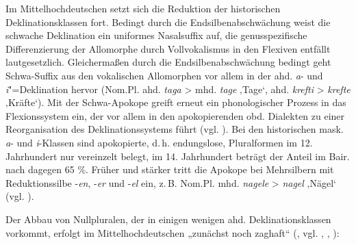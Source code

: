 Im Mittelhochdeutschen setzt sich die Reduktion der historischen Deklinationsklassen fort. Bedingt durch die Endsilbenabschwächung weist die schwache Deklination ein uniformes Nasalsuffix auf, die genusspezifische Differenzierung der Allomorphe durch Vollvokalismus in den Flexiven entfällt lautgesetzlich. Gleichermaßen durch die Endsilbenabschwächung bedingt geht Schwa-Suffix aus den vokalischen Allomorphen vor allem in der ahd. \textit{a}{}- und \textit{i}"=Deklination hervor (Nom.Pl. ahd. \textit{taga} > mhd. \textit{tage} ‚Tage‘, ahd. \textit{krefti} > \textit{krefte} ‚Kräfte‘). Mit der Schwa-Apokope greift erneut ein phonologischer Prozess in das Flexionssystem ein, der vor allem in den apokopierenden obd. Dialekten zu einer Reorganisation des Deklinationssystems führt (vgl. ). Bei den historischen mask. {\textit{a}}- und {\textit{i}}{}-Klassen sind apokopierte, d.\,h. endungslose, Pluralformen im 12. Jahrhundert nur vereinzelt belegt, im 14. Jahrhundert beträgt der Anteil im Bair. nach \citet[136]{KleinEtAl2018} dagegen 65 \%. Früher und stärker tritt die Apokope bei Mehrsilbern mit Reduktionssilbe -\textit{en}, -\textit{er} und -\textit{el} ein, z.\,B. Nom.Pl. mhd. \textit{nagele} > \textit{nagel} ‚Nägel‘ (vgl.
\citealt[137]{KleinEtAl2018}).

Der Abbau von Nullpluralen, der in einigen wenigen ahd. Deklinationsklassen vorkommt, erfolgt im Mittelhochdeutschen „zunächst noch zaghaft“ (\citealt[135]{KleinEtAl2018}, vgl. \citealt[201]{DammelGillmann2014}, \citealt[89]{Kürschner2008a}, \citealt[1544]{WegeraSolms2000}):

